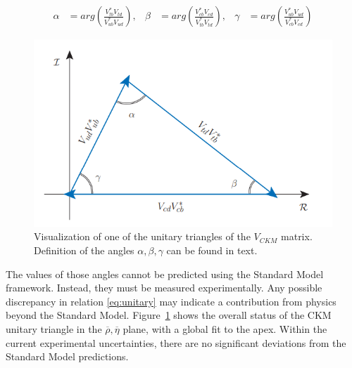 \begin{align*}
   \alpha &= arg\left( \frac{V_{tb}^{*}V_{td}}{V_{ub}^{*}V_{ud}} \right), & 
   \beta &=  arg\left( \frac{V_{cb}^{*}V_{cd}}{V_{tb}^{*}V_{td}} \right), &
   \gamma &= arg\left( \frac{V_{ub}^{*}V_{ud}}{V_{cb}^{*}V_{cd}} \right) 
\end{align*}



\begin{figure}[h]
\centering
\includegraphics[scale=0.8]{figures/Unitary_triangle.PNG}
\caption{Visualization of one of the unitary triangles of the $V_{CKM}$ matrix. Definition of the angles $\alpha, \beta, \gamma$ can be found in text.   
\label{fig:triangle}}
\end{figure}

The values of those angles cannot be predicted using the Standard Model framework. Instead, they must be measured experimentally. Any possible discrepancy in relation \ref{eq:unitary} may indicate a contribution from physics beyond the Standard Model. Figure~\ref{fig:triangle} shows the overall status of the CKM unitary triangle in the $\overline{\rho}, \overline{\eta}$ plane, with a global fit to the apex. Within the current experimental uncertainties, there are no significant deviations from the Standard Model predictions. 

